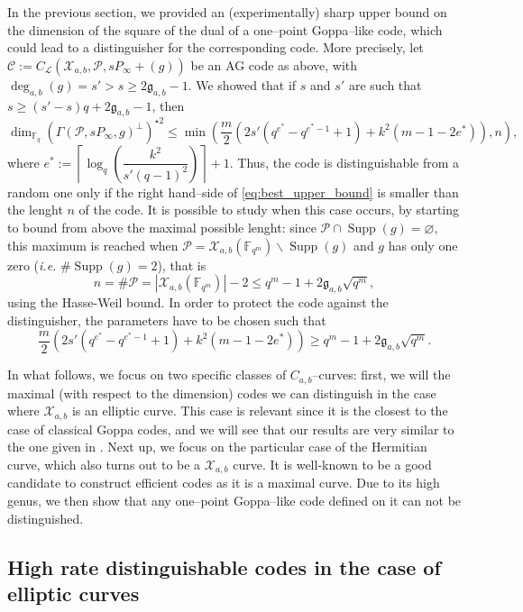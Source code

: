 \documentclass[a4paper]{article}
\theoremstyle{definition}
\theoremstyle{remark}
\newcommand{\calP}{\mathcal{P}}
\newcommand{\calL}{\mathcal{L}}
\newcommand{\calC}{\mathcal{C}}
\newcommand{\calX}{\mathcal{X}}
\newcommand{\fqm}{\mathbb{F}_{q^m}}
\newcommand{\fq}{\mathbb{F}_{q}}
\newcommand{\Supp}{\operatorname{Supp}}
\newcommand{\degab}[1]{\deg_{a,b}\left(#1\right)}
\begin{document}
In the previous section, we provided an (experimentally) sharp upper bound on the dimension of the square of the dual of a one--point Goppa--like code, which could lead to a distinguisher for the corresponding code. More precisely, let $\calC := C_\calL(\calX_{a,b},\calP,sP_\infty +(g))$ be an AG code as above, with $\degab{g} = s'>s\geq 2\mathfrak{g}_{a,b}-1$. We showed that if $s$ and $s'$ are such that $s \geq (s'-s)q+2\mathfrak{g}_{a,b}-1$, then
\begin{equation} \label{eq:best_upper_bound}
\dim_{\fq} (\Gamma(\calP,sP_\infty,g)^{\perp})^{\star 2} \leq \min \left(\frac{m}{2}\left(2s'(q^{e^*}-q^{e^*-1}+1)+k^2(m-1-2e^*)  \right),n\right),
\end{equation}
where $e^* := \left\lceil \log_q\left(\dfrac{k^2}{s'(q-1)^2}\right)\right\rceil+1$. Thus, the code is distinguishable from a random one only if the right hand--side of \eqref{eq:best_upper_bound} is smaller than the lenght $n$ of the code. It is possible to study when this case occurs, by starting to bound from above the maximal possible lenght: since $\calP \cap \Supp(g) = \varnothing,$ this maximum is reached when $\calP = \calX_{a,b}(\fqm) \backslash \Supp(g)$ and $g$ has only one zero (\emph{i.e.} $\#\Supp(g)=2$), that is
$$n = \# \calP = |\calX_{a,b}(\fqm)|-2 \leq q^m-1+2\mathfrak{g}_{a,b}\sqrt{q^m},$$
using the Hasse-Weil bound. In order to protect the code against the distinguisher, the parameters have to be chosen such that 
\begin{equation} \label{eq:cond_not_to_distinguish}
\frac{m}{2}\left(2s'(q^{e^*}-q^{e^*-1}+1)+k^2(m-1-2e^*)  \right)\geq q^m-1+2\mathfrak{g}_{a,b}\sqrt{q^m}.
\end{equation}

In what follows, we focus on two specific classes of $C_{a,b}$--curves: first, we will the maximal (with respect to the dimension) codes we can distinguish in the case where $\calX_{a,b}$ is an elliptic curve. This case is relevant since it is the closest to the case of classical Goppa codes, and we will see that our results are very similar to the one given in \cite{MT21}. Next up, we focus on the particular case of the Hermitian curve, which also turns out to be a $\calX_{a,b}$ curve. It is well-known to be a good candidate to construct efficient codes as it is a maximal curve. Due to its high genus, we then show that any one--point Goppa--like code defined on it can not be distinguished.

\subsection{High rate distinguishable codes in the case of elliptic curves}
\end{document}
